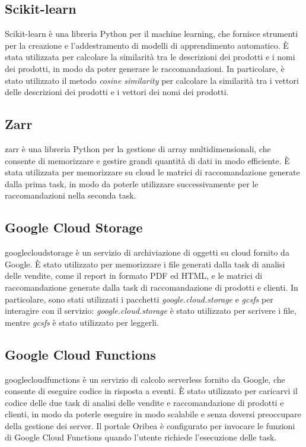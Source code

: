 \subsection{Scikit-learn}
Scikit-learn è una libreria Python per il machine learning, che fornisce strumenti per la creazione e l'addestramento di modelli di apprendimento automatico. È stata utilizzata per calcolare la similarità tra le descrizioni dei prodotti e i nomi dei prodotti, in modo da poter generare le raccomandazioni. In particolare, è stato utilizzato il metodo \emph{cosine similarity} per calcolare la similarità tra i vettori delle descrizioni dei prodotti e i vettori dei nomi dei prodotti.

\subsection{Zarr}
\gls{zarr} è una libreria Python per la gestione di array multidimensionali, che consente di memorizzare e gestire grandi quantità di dati in modo efficiente. È stata utilizzata per memorizzare su cloud le matrici di raccomandazione generate dalla prima task, in modo da poterle utilizzare successivamente per le raccomandazioni nella seconda task.

\subsection{Google Cloud Storage}
\gls{googlecloudstorage} è un servizio di archiviazione di oggetti su cloud fornito da Google. È stato utilizzato per memorizzare i file generati dalla task di analisi delle vendite, come il report in formato PDF ed HTML, e le matrici di raccomandazione generate dalla task di raccomandazione di prodotti e clienti. In particolare, sono stati utilizzati i pacchetti \emph{google.cloud.storage} e \emph{gcsfs} per interagire con il servizio: \emph{google.cloud.storage} è stato utilizzato per scrivere i file, mentre \emph{gcsfs} è stato utilizzato per leggerli.

\subsection{Google Cloud Functions}
\gls{googlecloudfunctions} è un servizio di calcolo serverless fornito da Google, che consente di eseguire codice in risposta a eventi. È stato utilizzato per caricarvi il codice delle due task di analisi delle vendite e raccomandazione di prodotti e clienti, in modo da poterle eseguire in modo scalabile e senza doversi preoccupare della gestione dei server. Il portale Oribea è configurato per invocare le funzioni di Google Cloud Functions quando l'utente richiede l'esecuzione delle task.

